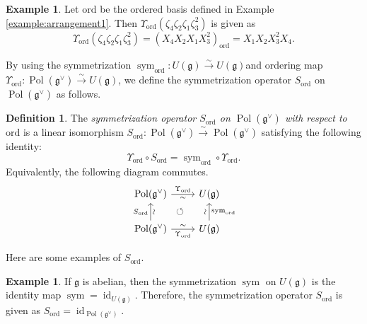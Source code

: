 \documentclass[a4paper,11pt,reqno]{amsart}
\newcommand{\frakg}{\mathfrak{g}}
\newcommand{\0}{{\bf 0}}
\newcommand{\1}{{\bf 1}}
\DeclareMathOperator{\Pol}{Pol}
\DeclareMathOperator{\id}{id}
\newcommand{\ord}{{\mathrm{ord}}}
\DeclareMathOperator{\sym}{sym}
\theoremstyle{plain}
\theoremstyle{definition}
\newtheorem{definition}[equation]{Definition}
\newtheorem{example}[equation]{Example}
\numberwithin{equation}{section}
\theoremstyle{definition}
\begin{document}
\begin{example}
Let $\ord$ be the ordered basis defined in 
Example \ref{example:arrangement1}.
Then $\Upsilon_{\ord}(\zeta_4\zeta_2\zeta_1\zeta_3^2)$
is given as
\begin{equation*}
\Upsilon_{\ord}(\zeta_4\zeta_2\zeta_1\zeta_3^2) 
=(X_4X_2X_1X_3^2)_\ord
=  X_1 X_2 X_3^2X_4.
\end{equation*}
\end{example}

By using the symmetrization $\sym_\ord \colon U(\frakg) \stackrel{\sim}{\to} U(\frakg)$and ordering map $\Upsilon_\ord \colon \Pol(\frakg^\vee) \stackrel{\sim}{\to} U(\frakg)$,
we define the symmetrization operator 
$S_{\ord}$ on $\Pol(\frakg^\vee)$ as follows.

\begin{definition}
The \emph{symmetrization operator
$S_{\ord}$ on $\Pol(\frakg^\vee)$
with respect to $\ord$} is a linear isomorphism 
$S_{\ord}\colon 
\Pol(\frakg^\vee)\stackrel{\sim}{\to}\Pol(\frakg^\vee)$ 
satisfying the following identity:
\begin{equation*}
\Upsilon_{\ord} \circ S_{\ord}=
\sym_{\ord} \circ \Upsilon_{\ord}.
\end{equation*}
Equivalently, the following diagram commutes.
\begin{equation}\label{eqn:orderization}
\begin{tikzcd}
	{\Pol(\frakg^\vee)}& {U(\frakg)}
	\arrow[dl, pos=0.5, phantom, "\circlearrowleft"] \\
	{\Pol(\frakg^\vee)} & {U(\frakg)}
	\arrow["{\Upsilon_{\ord}}", "\sim"' sloped, from=1-1, to=1-2]
	\arrow["{S_{\ord}}","\sim"' sloped,  from=2-1, to=1-1]
	\arrow["\sim" sloped, "\sym_{\ord}"',  from=2-2, to=1-2]
	\arrow["\sim" sloped,"{\Upsilon_{\ord}}"', from=2-1, to=2-2]
\end{tikzcd}
\end{equation}
\end{definition}

Here are some examples of $S_{\ord}$.

\begin{example}
If $\frakg$ is abelian, then
the symmetrization $\sym$ on $U(\frakg)$
is the identity map $\sym = \id_{U(\frakg)}$.
Therefore, the symmetrization operator $S_{\ord}$ is given as 
$S_{\ord}=\id_{\Pol(\frakg^\vee)}$.
\end{example}
\end{document}
